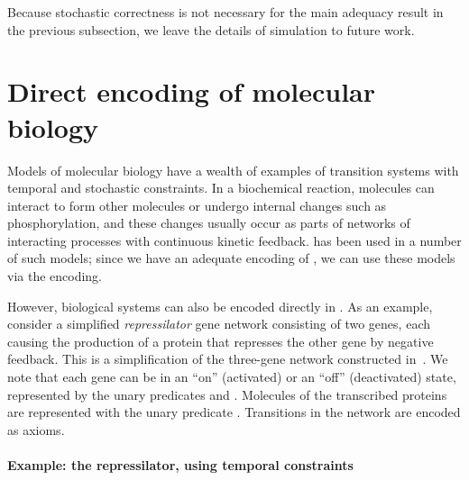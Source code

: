 \documentclass{article}
\begin{document}
Because stochastic correctness is not necessary for the main adequacy result in
the previous subsection, we leave the details of simulation to future work.

\section{Direct encoding of molecular biology}
\label{sec:bio}

Models of molecular biology have a wealth of examples of transition systems with
temporal and stochastic constraints.  In a biochemical reaction, molecules can
interact to form other molecules or undergo internal changes such as
phosphorylation, and these changes usually occur as parts of networks of
interacting processes with continuous kinetic feedback. \spi has been used in a
number of such models; since we have an adequate encoding of \spi, we can use
these models via the encoding.

However, biological systems can also be encoded directly in \hyll. As an
example, consider a simplified \emph{repressilator} gene network consisting of
two genes, each causing the production of a protein that represses the other
gene by negative feedback. This is a simplification of the three-gene network
constructed in~\cite{elowitz00nature}.  We note that each gene can be in an
``on'' (activated) or an ``off'' (deactivated) state, represented by the unary
predicates  and . Molecules of the transcribed proteins are
represented with the unary predicate . Transitions in the network are
encoded as axioms.

\paragraph{Example: the repressilator, using temporal constraints}
\end{document}
